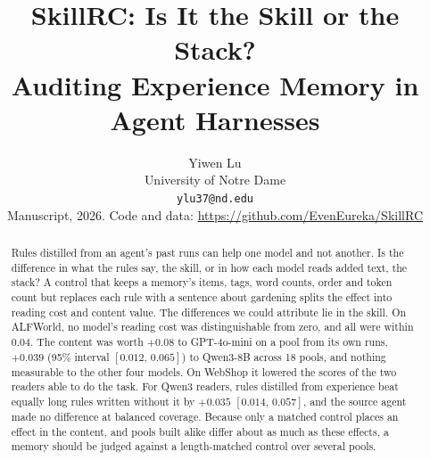 \documentclass[11pt]{article}
\title{SkillRC: Is It the Skill or the Stack?\\Auditing Experience Memory in Agent Harnesses}
\author{Yiwen Lu \\
  University of Notre Dame \\
  \texttt{ylu37@nd.edu} \\[2pt]
  {\small Manuscript, 2026. Code and data: \url{https://github.com/EvenEureka/SkillRC}}}
\newcommand{\ci}[2]{$[#1,\,#2]$}
\begin{document}
\maketitle

\begin{abstract}
Rules distilled from an agent's past runs can help one model and not another. Is the difference in
what the rules say, the skill, or in how each model reads added text, the stack? A control that keeps a
memory's items, tags, word counts, order and token count but replaces each rule with a sentence about
gardening splits the effect into reading cost and content value. The differences we could attribute lie
in the skill. On ALFWorld, no model's reading cost was distinguishable from zero, and all were within 0.04. The content was worth $+0.08$ to GPT-4o-mini on a pool from its own runs, $+0.039$ (95\% interval
\ci{0.012}{0.065}) to Qwen3-8B across 18 pools, and nothing measurable to the other four models. On
WebShop it lowered the scores of the two readers able to do the task. For Qwen3 readers, rules distilled
from experience beat equally long rules written without it by $+0.035$ \ci{0.014}{0.057}, and the source
agent made no difference at balanced coverage. Because only a matched control places an effect in the content, and pools built alike differ about as
much as these effects, a memory should be judged against a length-matched control over several pools.
\end{abstract}


\end{document}
